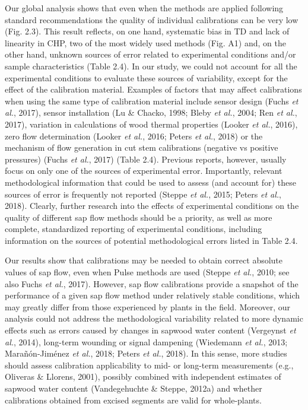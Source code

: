 \documentclass[11pt,twoside]{reedthesis}
\begin{document}
Our global analysis shows that even when the methods are applied
following standard recommendations the quality of individual
calibrations can be very low (Fig. 2.3). This result reflects, on one
hand, systematic bias in TD and lack of linearity in CHP, two of the
most widely used methods (Fig. A1) and, on the other hand, unknown
sources of error related to experimental conditions and/or sample
characteristics (Table 2.4). In our study, we could not account for all
the experimental conditions to evaluate these sources of variability,
except for the effect of the calibration material. Examples of factors
that may affect calibrations when using the same type of calibration
material include sensor design (Fuchs \emph{et al.}, 2017), sensor
installation (Lu \& Chacko, 1998; Bleby \emph{et al.}, 2004; Ren
\emph{et al.}, 2017), variation in calculations of wood thermal
properties (Looker \emph{et al.}, 2016), zero flow determination (Looker
\emph{et al.}, 2016; Peters \emph{et al.}, 2018) or the mechanism of
flow generation in cut stem calibrations (negative vs positive
pressures) (Fuchs \emph{et al.}, 2017) (Table 2.4). Previous reports,
however, usually focus on only one of the sources of experimental error.
Importantly, relevant methodological information that could be used to
assess (and account for) these sources of error is frequently not
reported (Steppe \emph{et al.}, 2015; Peters \emph{et al.}, 2018).
Clearly, further research into the effects of experimental conditions on
the quality of different sap flow methods should be a priority, as well
as more complete, standardized reporting of experimental conditions,
including information on the sources of potential methodological errors
listed in Table 2.4.\par

Our results show that calibrations may be needed to obtain correct
absolute values of sap flow, even when Pulse methods are used (Steppe
\emph{et al.}, 2010; see also Fuchs \emph{et al.}, 2017). However, sap
flow calibrations provide a snapshot of the performance of a given sap
flow method under relatively stable conditions, which may greatly differ
from those experienced by plants in the field. Moreover, our analysis
could not address the methodological variability related to more dynamic
effects such as errors caused by changes in sapwood water content
(Vergeynst \emph{et al.}, 2014), long-term wounding or signal dampening
(Wiedemann \emph{et al.}, 2013; Marañón-Jiménez \emph{et al.}, 2018;
Peters \emph{et al.}, 2018). In this sense, more studies should assess
calibration applicability to mid- or long-term measurements (e.g.,
Oliveras \& Llorens, 2001), possibly combined with independent estimates
of sapwood water content (Vandegehuchte \& Steppe, 2012a) and whether
calibrations obtained from excised segments are valid for
whole-plants.\par
\end{document}
